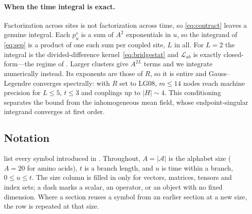 \documentclass[11pt]{article}
\newcommand{\Xset}{\mathcal{A}}
\begin{document}
\paragraph{When the time integral is exact.} Factorization across sites is not
factorization across time, so \eqref{eq:contract} leaves a genuine integral. Each
$p^s_u$ is a sum of $A^2$ exponentials in $u$, so the integrand of \eqref{eq:sep} is a
product of one such sum per coupled site, $L$ in all. For $L=2$ the integral is the
divided-difference kernel~\eqref{eq:bridgestat} and $\mathcal L_{ab}$ is
exactly closed-form---the regime of . Larger clusters give $A^{2L}$
terms and we integrate numerically instead. Its exponents are those of $R$, so it is
entire and Gauss--Legendre converges spectrally: with $R$ set to LG08, $m\le14$ nodes reach
machine precision for $L\le5$, $t\le3$ and couplings up to $|H|\sim4$. This conditioning separates
the bound from the inhomogeneous mean field, whose endpoint-singular integrand converges
at first order.





\subsection{Notation}
\label{app:notation}

list every symbol introduced in . Throughout, $A=|\Xset|$ is the alphabet size ($A=20$ for amino
acids), $t$ is a branch length, and $u$ is time within a branch, $0\le u\le t$. The
size column is filled in only for vectors, matrices, tensors and index sets; a dash
marks a scalar, an operator, or an object with no fixed dimension. Where a section
reuses a symbol from an earlier section at a new size, the row is repeated at that
size.
\end{document}
